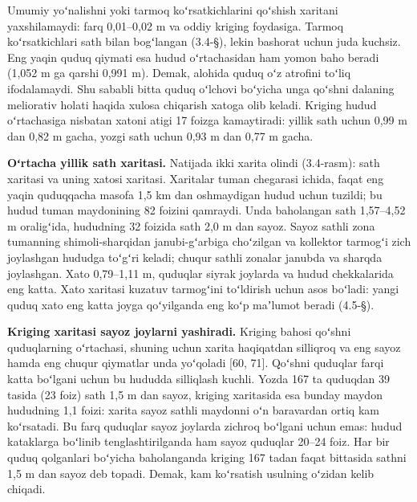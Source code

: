 Umumiy yoʻnalishni yoki tarmoq koʻrsatkichlarini qoʻshish xaritani
yaxshilamaydi: farq 0,01--0,02 m va oddiy kriging foydasiga. Tarmoq
koʻrsatkichlari sath bilan bogʻlangan (3.4-§), lekin bashorat uchun juda
kuchsiz. Eng yaqin quduq qiymati esa hudud oʻrtachasidan ham yomon baho
beradi (1,052 m ga qarshi 0,991 m). Demak, alohida quduq oʻz atrofini
toʻliq ifodalamaydi. Shu sababli bitta quduq oʻlchovi boʻyicha unga
qoʻshni dalaning meliorativ holati haqida xulosa chiqarish xatoga olib
keladi. Kriging hudud oʻrtachasiga nisbatan xatoni atigi 17 foizga
kamaytiradi: yillik sath uchun 0,99 m dan 0,82 m gacha, yozgi sath uchun
0,93 m dan 0,77 m gacha.

\textbf{Oʻrtacha yillik sath xaritasi.} Natijada ikki xarita olindi
(3.4-rasm): sath xaritasi va uning xatosi xaritasi. Xaritalar tuman
chegarasi ichida, faqat eng yaqin quduqqacha masofa 1,5 km dan
oshmaydigan hudud uchun tuzildi; bu hudud tuman maydonining 82 foizini
qamraydi. Unda baholangan sath 1,57--4,52 m oraligʻida, hududning 32
foizida sath 2,0 m dan sayoz. Sayoz sathli zona tumanning
shimoli-sharqidan janubi-gʻarbiga choʻzilgan va kollektor tarmogʻi zich
joylashgan hududga toʻgʻri keladi; chuqur sathli zonalar janubda va
sharqda joylashgan. Xato 0,79--1,11 m, quduqlar siyrak joylarda va hudud
chekkalarida eng katta. Xato xaritasi kuzatuv tarmogʻini toʻldirish
uchun asos boʻladi: yangi quduq xato eng katta joyga qoʻyilganda eng
koʻp maʼlumot beradi (4.5-§).



\textbf{Kriging xaritasi sayoz joylarni yashiradi.} Kriging bahosi
qoʻshni quduqlarning oʻrtachasi, shuning uchun xarita haqiqatdan
silliqroq va eng sayoz hamda eng chuqur qiymatlar unda yoʻqoladi {[}60,
71{]}. Qoʻshni quduqlar farqi katta boʻlgani uchun bu hududda silliqlash
kuchli. Yozda 167 ta quduqdan 39 tasida (23 foiz) sath 1,5 m dan sayoz,
kriging xaritasida esa bunday maydon hududning 1,1 foizi: xarita sayoz
sathli maydonni oʻn baravardan ortiq kam koʻrsatadi. Bu farq quduqlar
sayoz joylarda zichroq boʻlgani uchun emas: hudud kataklarga boʻlinib
tenglashtirilganda ham sayoz quduqlar 20--24 foiz. Har bir quduq
qolganlari boʻyicha baholanganda kriging 167 tadan faqat bittasida
sathni 1,5 m dan sayoz deb topadi. Demak, kam koʻrsatish usulning
oʻzidan kelib chiqadi.

